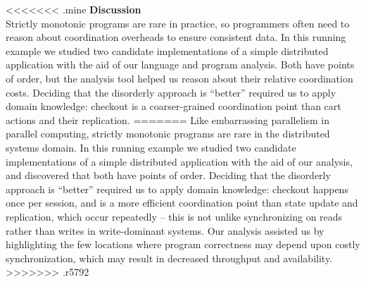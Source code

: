<<<<<<< .mine
\noindent
\textbf{Discussion}\\
\noindent
Strictly monotonic programs
are rare in practice, so programmers often need to reason about coordination overheads to ensure consistent data.  In this running example we studied
two candidate implementations of a simple distributed application with the aid of
our language and program analysis. Both have points of order, but the analysis tool helped us reason about their relative coordination costs.  Deciding that the disorderly
approach is ``better'' required us to apply domain knowledge: checkout is a coarser-grained coordination point than cart actions and their replication.
=======
Like embarrassing parallelism in parallel computing, strictly monotonic
programs are rare in the distributed systems domain.  In this running example
we studied two candidate implementations of a simple distributed application
with the aid of our analysis, and discovered that both have points of order.
Deciding that the disorderly approach is ``better'' required us to apply domain
knowledge: checkout happens once per session, and is a more efficient
coordination point than state update and replication, which occur repeatedly --
this is not unlike synchronizing on reads rather than writes in write-dominant
systems.  Our analysis assisted us by highlighting the few locations where
program correctness may depend upon costly synchronization, which may result in
decreased throughput and availability.  
>>>>>>> .r5792

